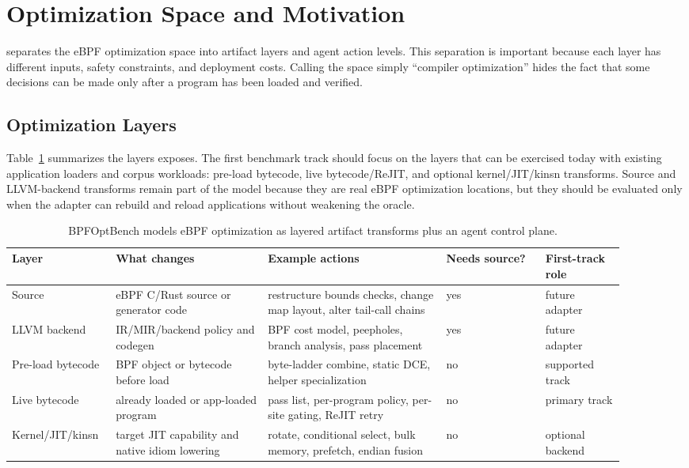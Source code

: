 \section{Optimization Space and Motivation}
\label{sec:space}

\sys separates the eBPF optimization space into artifact layers and agent action levels. This separation is important because each layer has different inputs, safety constraints, and deployment costs. Calling the space simply ``compiler optimization'' hides the fact that some decisions can be made only after a program has been loaded and verified.

\subsection{Optimization Layers}

Table~\ref{tab:layers} summarizes the layers \sys exposes. The first benchmark track should focus on the layers that can be exercised today with existing application loaders and corpus workloads: pre-load bytecode, live bytecode/ReJIT, and optional kernel/JIT/kinsn transforms. Source and LLVM-backend transforms remain part of the model because they are real eBPF optimization locations, but they should be evaluated only when the adapter can rebuild and reload applications without weakening the oracle.

\begin{table}[t]
\small
\centering
\caption{BPFOptBench models eBPF optimization as layered artifact transforms plus an agent control plane.}
\label{tab:layers}
\begin{tabular}{p{0.13\linewidth}p{0.23\linewidth}p{0.27\linewidth}p{0.15\linewidth}p{0.12\linewidth}}
\hline
Layer & What changes & Example actions & Needs source? & First-track role \\
\hline
Source & eBPF C/Rust source or generator code & restructure bounds checks, change map layout, alter tail-call chains & yes & future adapter \\
LLVM backend & IR/MIR/backend policy and codegen & BPF cost model, peepholes, branch analysis, pass placement & yes & future adapter \\
Pre-load bytecode & BPF object or bytecode before load & byte-ladder combine, static DCE, helper specialization & no & supported track \\
Live bytecode & already loaded or app-loaded program & pass list, per-program policy, per-site gating, ReJIT retry & no & primary track \\
Kernel/JIT/kinsn & target JIT capability and native idiom lowering & rotate, conditional select, bulk memory, prefetch, endian fusion & no & optional backend \\
\hline
\end{tabular}
\end{table}

